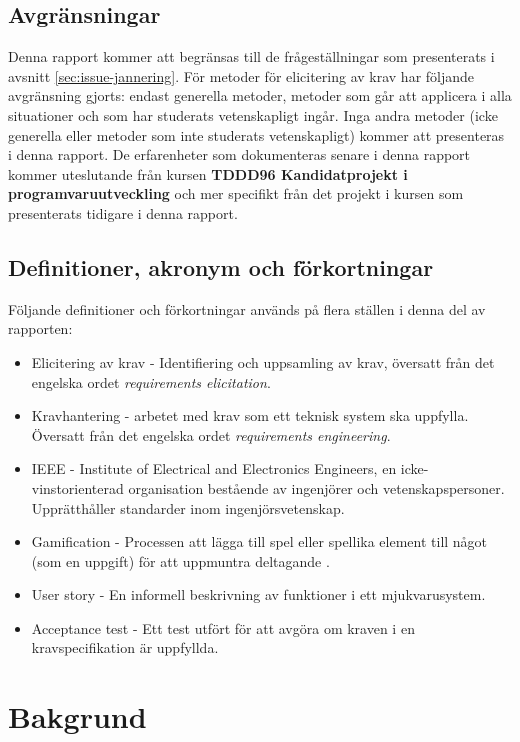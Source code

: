 \subsection{Avgränsningar}
\label{sec:limits-jannering}
Denna rapport kommer att begränsas till de frågeställningar som presenterats i avsnitt \ref{sec:issue-jannering}. För metoder för elicitering av krav har följande avgränsning gjorts: endast generella metoder, metoder som går att applicera i alla situationer och som har studerats vetenskapligt ingår. Inga andra metoder (icke generella eller metoder som inte studerats vetenskapligt) kommer att presenteras i denna rapport. De erfarenheter som dokumenteras senare i denna rapport kommer uteslutande från kursen \textbf{TDDD96 	Kandidatprojekt i programvaruutveckling} och mer specifikt från det projekt i kursen som presenterats tidigare i denna rapport.   
\subsection{Definitioner, akronym och förkortningar}
\label{sec:def-jannering}
Följande definitioner och förkortningar används på flera ställen i denna del av rapporten:
\begin{itemize}
	\item Elicitering av krav - Identifiering och uppsamling av krav, översatt från det engelska ordet \textit{requirements elicitation}.
	\item Kravhantering -  arbetet med krav som ett teknisk system ska uppfylla. Översatt från det engelska ordet \textit{requirements engineering}.
	\item IEEE - Institute of Electrical and Electronics Engineers, en icke-vinstorienterad organisation bestående av ingenjörer och vetenskapspersoner. Upprätthåller standarder inom ingenjörsvetenskap.
	\item Gamification - Processen att lägga till spel eller spellika element till något (som en uppgift) för att uppmuntra deltagande \cite{lombriser2016gamified}.
	\item User story - En informell beskrivning av  funktioner i ett mjukvarusystem.
	\item Acceptance test - Ett test utfört för att avgöra om kraven i en kravspecifikation är uppfyllda.
\end{itemize}
\section{Bakgrund}
\label{sec:background-jannering}

